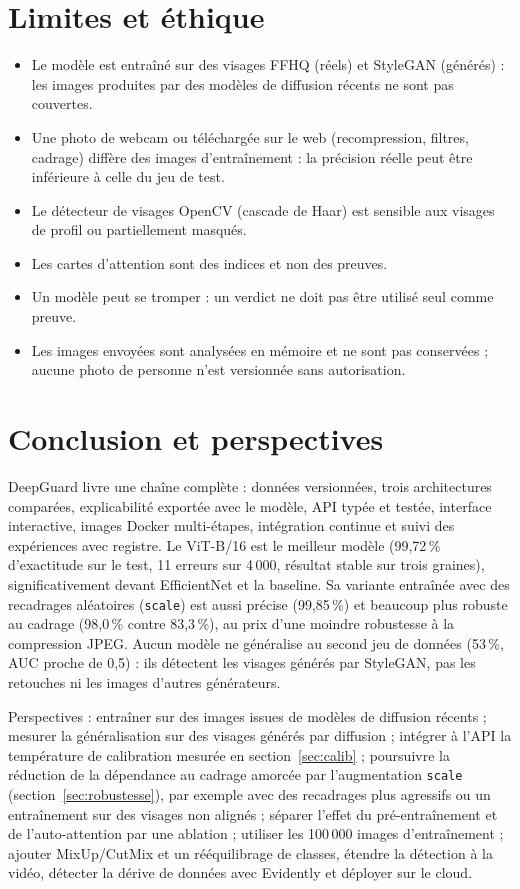 \documentclass[11pt,a4paper]{article}
\newcommand{\nomprojet}{DeepGuard}
\begin{document}
\section{Limites et éthique}

\begin{itemize}
  \item Le modèle est entraîné sur des visages FFHQ (réels) et StyleGAN (générés) : les images produites par des
        modèles de diffusion récents ne sont pas couvertes.
  \item Une photo de webcam ou téléchargée sur le web (recompression, filtres, cadrage) diffère des images
        d'entraînement : la précision réelle peut être inférieure à celle du jeu de test.
  \item Le détecteur de visages OpenCV (cascade de Haar) est sensible aux visages de profil ou partiellement masqués.
  \item Les cartes d'attention sont des indices et non des preuves.
  \item Un modèle peut se tromper : un verdict ne doit pas être utilisé seul comme preuve.
  \item Les images envoyées sont analysées en mémoire et ne sont pas conservées ; aucune photo de personne n'est
        versionnée sans autorisation.
\end{itemize}

\section{Conclusion et perspectives}

\nomprojet{} livre une chaîne complète : données versionnées, trois architectures comparées, explicabilité exportée avec
le modèle, API typée et testée, interface interactive, images Docker multi-étapes, intégration continue et suivi des
expériences avec registre. Le ViT-B/16 est le meilleur modèle (99,72\,\% d'exactitude sur le test, 11 erreurs sur 4\,000, résultat stable sur trois graines), significativement devant EfficientNet et la baseline. Sa variante entraînée avec des recadrages aléatoires (\texttt{scale}) est aussi précise (99,85\,\%) et beaucoup plus robuste au cadrage (98,0\,\% contre 83,3\,\%), au prix d'une moindre robustesse à la compression JPEG. Aucun modèle ne généralise au second jeu de données (53\,\%, AUC proche de 0,5) : ils détectent les visages générés par StyleGAN, pas les retouches ni les images d'autres générateurs.

Perspectives : entraîner sur des images issues de modèles de diffusion récents ; mesurer la généralisation sur des visages générés par diffusion ; intégrer à l'API la température de calibration mesurée en section~\ref{sec:calib} ; poursuivre la réduction de la dépendance au cadrage amorcée par l'augmentation \texttt{scale} (section~\ref{sec:robustesse}), par exemple avec des recadrages plus agressifs ou un entraînement sur des visages non alignés ; séparer l'effet du pré-entraînement et de l'auto-attention par une ablation ; utiliser les 100\,000 images d'entraînement ; ajouter MixUp/CutMix et un
rééquilibrage de classes, étendre la détection à la vidéo, détecter la dérive de données avec Evidently et déployer sur
le cloud.
\end{document}
